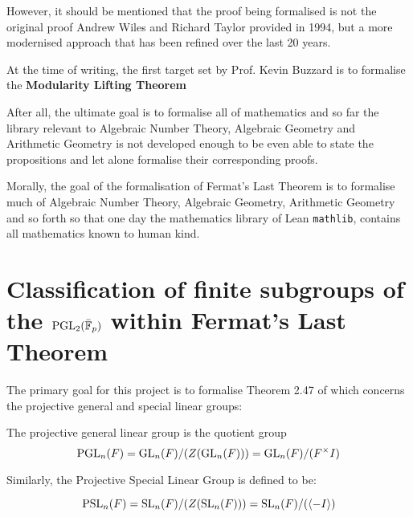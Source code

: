 However, it should be mentioned that the proof being formalised is not the original proof Andrew Wiles and Richard Taylor provided in 1994, 
but a more modernised approach that has been refined over the last 20 years.

At the time of writing, the first target set by Prof. Kevin Buzzard is to formalise the \textbf{Modularity Lifting Theorem}



After all, the ultimate goal is to formalise all of mathematics and so far the library relevant to Algebraic Number Theory, Algebraic Geometry and Arithmetic Geometry is not developed enough
to be even able to state the propositions and let alone formalise their corresponding proofs.

Morally, the goal of the formalisation of Fermat's Last Theorem is to formalise much of Algebraic Number Theory, Algebraic Geometry, Arithmetic Geometry and so forth so that one day
the mathematics library of Lean \texttt{mathlib}, contains all mathematics known to human kind.



\section{Classification of finite subgroups of the $\operatorname{PGL}_2(\bar{\mathbb{F}}_p)$ within Fermat's Last Theorem}

The primary goal for this project is to formalise Theorem 2.47 of \cite{dtt} which 
concerns the projective general and special linear groups:

\begin{definition}
    The projective general linear group is the quotient group
    \[    
    \operatorname{PGL}_n(F) = \operatorname{GL}_n(F) / (Z(\operatorname{GL}_n(F))) = \operatorname{GL}_n(F) / (F^\times I) 
    \]
\end{definition}

Similarly, the Projective Special Linear Group is defined to be:

\begin{definition}
    \[
    \operatorname{PSL}_n(F) = \operatorname{SL}_n(F) / (Z(\operatorname{SL}_n(F))) = \operatorname{SL}_n(F) / (\langle -I\rangle)
    \]
\end{definition}

